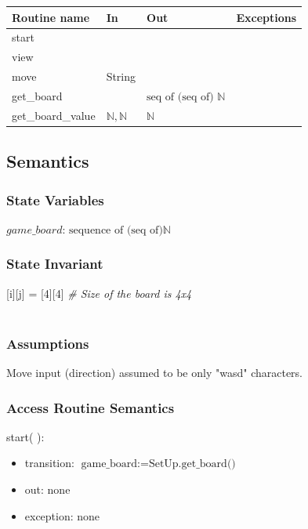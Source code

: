 \documentclass[12pt]{article}
\begin{document}
\begin{tabular}{| l | l | l | p{5cm} |}
  \hline
  \textbf{Routine name} & \textbf{In} & \textbf{Out} & \textbf{Exceptions}\\
  \hline
  start & & & & \\
  \hline
  view & & & \\
  \hline
  move & String & & \\
  \hline
  get\_board & & $\text{seq of (seq of) } \mathbb{N}$ & \\
  \hline
  get\_board\_value & $\mathbb{N}, \mathbb{N}$ & $\mathbb{N}$ & \\
  \hline
  
\end{tabular}

\subsection* {Semantics}

\subsubsection* {State Variables}

$\mathit{game\_board}$: $\text{sequence of (seq of)} \mathbb{N}$

\subsubsection* {State Invariant}

[i][j] = [4][4]  \textit{\# Size of the board is 4x4}~\\\

\subsubsection* {Assumptions}

Move input (direction) assumed to be only "wasd" characters. 

\subsubsection* {Access Routine Semantics}

\noindent start( ):
\begin{itemize}
\item transition: $\text{game\_board} := \text{SetUp.get\_board()}$
\item out: none
\item exception: none
\end{itemize}
\end{document}
